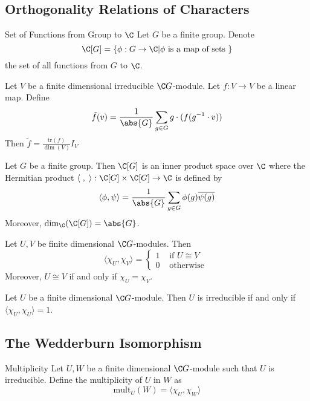 \documentclass[a4paper]{article}
\begin{document}
\subsection{Orthogonality Relations of Characters}
\begin{defn}{Set of Functions from Group to $\C$}{} Let $G$ be a finite group. Denote $$\C[G]=\{\phi:G\to\C|\phi\text{ is a map of sets }\}$$ the set of all functions from $G$ to $\C$. 
\end{defn}

\begin{lmm}{}{} Let $V$ be a finite dimensional irreducible $\C G$-module. Let $f:V\to V$ be a linear map. Define $$\tilde{f}(v)=\frac{1}{\abs{G}}\sum_{g\in G}g\cdot(f(g^{-1}\cdot v))$$ Then $\tilde{f}=\frac{\text{tr}(f)}{\dim(V)}I_V$
\end{lmm}

\begin{prp}{}{} Let $G$ be a finite group. Then $\C[G]$ is an inner product space over $\C$ where the Hermitian product $\langle\;,\;\rangle:\C[G]\times \C[G]\to\C$ is defined by $$\langle \phi,\psi\rangle=\frac{1}{\abs{G}}\sum_{g\in G}\phi(g)\overline{\psi(g)}$$
Moreover, $\dim_\C(\C[G])=\abs{G}$. 
\end{prp}

\begin{thm}{}{} Let $U,V$ be finite dimensional $\C G$-modules. Then $$\langle\chi_U,\chi_V\rangle=\begin{cases}
1 & \text{ if }U\cong V\\
0 & \text{ otherwise }
\end{cases}$$
Moreover, $U\cong V$ if and only if $\chi_U=\chi_V$. 
\end{thm}

\begin{lmm}{}{} Let $U$ be a finite dimensional $\C G$-module. Then $U$ is irreducible if and only if $\langle\chi_U,\chi_U\rangle=1$. 
\end{lmm}

\subsection{The Wedderburn Isomorphism}
\begin{defn}{Multiplicity}{} Let $U,W$ be a finite dimensional $\C G$-module such that $U$ is irreducible. Define the multiplicity of $U$ in $W$ as $$\text{mult}_U(W)=\langle\chi_U,\chi_W\rangle$$
\end{defn}
\end{document}
